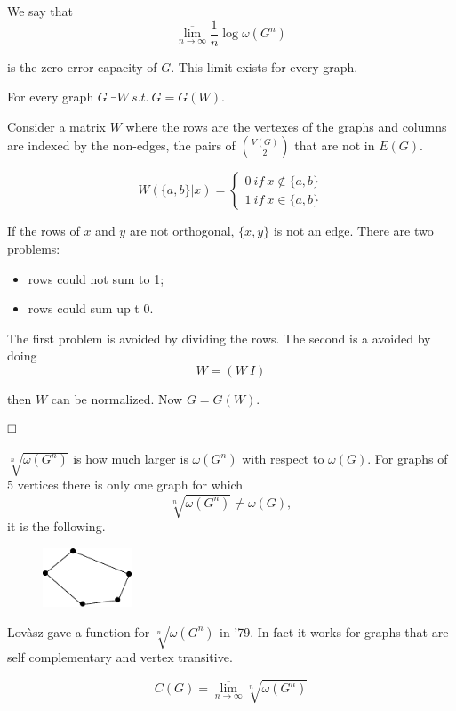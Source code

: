 We say that 
\[
\overline{\lim_{n \rightarrow \infty}}\dfrac{1}{n}\log \omega(G^n)
\]

is the zero error capacity of $G$. This limit exists for every graph.

\begin{prop}
	For every graph $G\ \exists W\ s.t.\ G = G(W)$.
\end{prop}

Consider a matrix $W$ where the rows are the vertexes of the graphs and columns are indexed by the non-edges, \ie the pairs of $\binom{V(G)}{2}$ that are not in $E(G)$.

\begin{equation}
	W(\{a,b\}|x) = \begin{cases}
	0\ if\ x\not\in \{a, b\}\\
	1\ if\ x\in \{a, b\}
	\end{cases}
\end{equation}

If the rows of $x$ and $y$ are not orthogonal, $\{x, y\}$ is not an edge. There are two problems:
\begin{itemize}
	\item rows could not sum to 1;
	\item rows could sum up t 0.
\end{itemize}

The first problem is avoided by dividing the rows. The second is a avoided by doing
\[
W = (W\ I)
\]

then $W$ can be normalized. Now $G = G(W)$.

$\hfill\Box$

$ \sqrt[n]{\omega(G^n)}$ is how much larger is $\omega(G^n)$ with respect to $\omega(G)$. For graphs of $5$ vertices there is only one graph for which
\[
 \sqrt[n]{\omega(G^n)} \not=\omega(G),
\]
it is the following.
\begin{figure}[h!]
	\centering
	\includegraphics[width=100px]{pictures/graph5v.eps}
\end{figure}

Lovàsz gave a function for $ \sqrt[n]{\omega(G^n)}$ in '79. In fact it works for graphs that are self complementary and vertex transitive.

\begin{equation}
	C(G) = \overline{\lim_{n\rightarrow \infty}}  \sqrt[n]{\omega(G^n)}
\end{equation}

